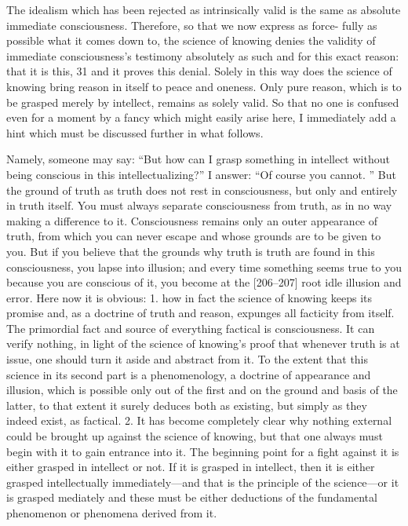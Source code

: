 The idealism which has been rejected as intrinsically valid is the same as
absolute immediate consciousness.
Therefore, so that we now express as force-
fully as possible what it comes down to, the science of knowing denies the
validity of immediate consciousness’s testimony absolutely as such and for this
exact reason: that it is this, 31 and it proves this denial.
Solely in this way does
the science of knowing bring reason in itself to peace and oneness.
Only pure
reason, which is to be grasped merely by intellect, remains as solely valid.
So
that no one is confused even for a moment by a fancy which might easily arise
here, I immediately add a hint which must be discussed further in what follows.

Namely, someone may say: “But how can I grasp something in intellect without
being conscious in this intellectualizing?” I answer: “Of course you cannot.
” But
the ground of truth as truth does not rest in consciousness, but only and
entirely in truth itself.
You must always separate consciousness from truth, as
in no way making a difference to it.
Consciousness remains only an outer
appearance of truth, from which you can never escape and whose grounds are
to be given to you.
But if you believe that the grounds why truth is truth are
found in this consciousness, you lapse into illusion; and every time something
seems true to you because you are conscious of it, you become at the [206–207]
root idle illusion and error.
Here now it is obvious: 1.
how in fact the science
of knowing keeps its promise and, as a doctrine of truth and reason, expunges
all facticity from itself.
The primordial fact and source of everything factical is
consciousness.
It can verify nothing, in light of the science of knowing’s proof
that whenever truth is at issue, one should turn it aside and abstract from it.
To
the extent that this science in its second part is a phenomenology, a doctrine of
appearance and illusion, which is possible only out of the first and on the
ground and basis of the latter, to that extent it surely deduces both as existing,
but simply as they indeed exist, as factical.
2.
It has become completely clear
why nothing external could be brought up against the science of knowing, but
that one always must begin with it to gain entrance into it.
The beginning
point for a fight against it is either grasped in intellect or not.
If it is grasped in
intellect, then it is either grasped intellectually immediately—and that is the
principle of the science—or it is grasped mediately and these must be either
deductions of the fundamental phenomenon or phenomena derived from it.


